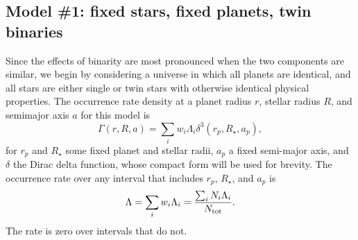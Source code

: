 \subsection{Model \#1: fixed stars, fixed planets, twin binaries}
\label{sec:model_1}

Since the effects of binarity are most pronounced when the two components are 
similar, we begin by considering a universe in which all planets are 
identical, and all stars are either single or twin stars with otherwise 
identical physical properties.
The occurrence rate density at a planet radius $r$, stellar radius $R$, and 
semimajor axis $a$ for this model is
\begin{equation}
\Gamma(r,R,a) = \sum_i w_i \Lambda_i \delta^3(r_p,R_\star,a_p),
\label{eq:model1_occ_rate_density}
\end{equation}
for $r_p$ and $R_\star$ some fixed planet and stellar radii, $a_p$ a fixed 
semi-major axis, and $\delta$ the Dirac delta function, whose compact
form will be used for brevity.
The occurrence rate over any interval that includes $r_p$, $R_\star$, and 
$a_p$ is
\begin{equation}
\Lambda = \sum_i w_i \Lambda_i = \frac{ \sum_i N_i \Lambda_i }{N_{\rm tot}}.
\end{equation}
The rate is zero over intervals that do not.

